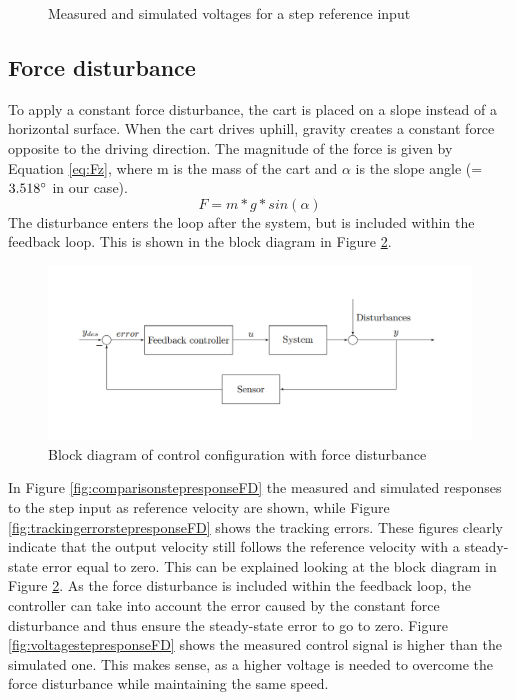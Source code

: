 \documentclass[a4paper,kul]{kulakarticle} %
\begin{document}
\begin{figure}[htp!]
\begin{subfigure}[b]{0.49\textwidth}
	\end{subfigure}
	\caption{Measured and simulated voltages for a step reference input}
	\label{fig:voltagestepresponse}
\end{figure}
\newpage
\subsection{Force disturbance}
To apply a constant force disturbance, the cart is placed on a slope instead of a horizontal surface. When the cart drives uphill, gravity creates a constant force opposite to the driving direction. The magnitude of the force is given by Equation \ref{eq:Fz}, where m is the mass of the cart and $\alpha$ is the slope angle (= $3.518\degree$ in our case). 
\begin{equation}
	\label{eq:Fz}
	F = m*g*sin(\alpha)
\end{equation}
The disturbance enters the loop after the system, but is included within the feedback loop. This is shown in the block diagram in Figure \ref{fig: blockdiagram}.
\begin{figure}[htp!]
	\centering
	\includegraphics[width=\linewidth]{blockdiagram.png}
	\caption{Block diagram of control configuration with force disturbance \cite{tikz}}
	\label{fig: blockdiagram}
\end{figure}

In Figure \ref{fig:comparisonstepresponseFD} the measured and simulated responses to the step input as reference velocity are shown, while Figure \ref{fig:trackingerrorstepresponseFD} shows the tracking errors. These figures clearly indicate that the output velocity still follows the reference velocity with a steady-state error equal to zero. This can be explained looking at the block diagram in Figure \ref{fig: blockdiagram}. As the force disturbance is included within the feedback loop, the controller can take into account the error caused by the constant force disturbance and thus ensure the steady-state error to go to zero. Figure \ref{fig:voltagestepresponseFD} shows the measured control signal is higher than the simulated one. This makes sense, as a higher voltage is needed to overcome the force disturbance while maintaining the same speed. 
\end{document}
